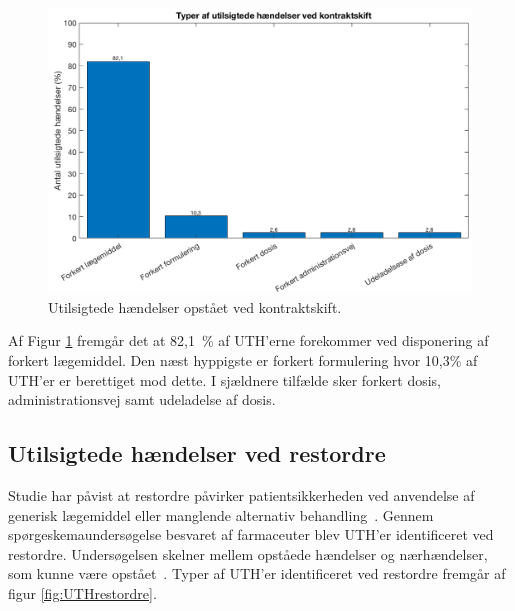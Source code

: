 \begin{figure}[H]\centering
	\includegraphics[width=1\textwidth]{billeder/UTH1.png} 
	\caption{Utilsigtede hændelser opstået ved kontraktskift\citep{Hakonsen2010}.}
	\label{fig:UTHkontraktskift}  
\end{figure}

Af Figur \ref{fig:UTHkontraktskift} fremgår det at 82,1~\% af UTH'erne forekommer ved disponering af forkert lægemiddel. Den næst hyppigste er forkert formulering hvor 10,3\% af UTH'er er berettiget mod dette. I  sjældnere tilfælde sker forkert dosis, administrationsvej samt udeladelse af dosis. 

\subsection{Utilsigtede hændelser ved restordre}
Studie har påvist at restordre påvirker patientsikkerheden ved anvendelse af generisk lægemiddel eller manglende alternativ behandling~\citep{Baumer2004}. Gennem spørgeskemaundersøgelse besvaret af farmaceuter blev UTH'er identificeret ved restordre. Undersøgelsen skelner mellem opståede hændelser og nærhændelser, som kunne være opstået~\citep{McLaughlin2013,McBride2013}. Typer af UTH'er identificeret ved restordre fremgår af figur \ref{fig:UTHrestordre}. 


